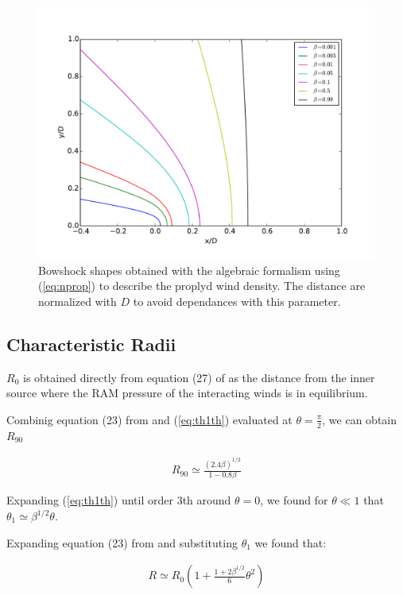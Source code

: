 \begin{figure}
\includegraphics[width=\linewidth]{r-beta}
\caption{Bowshock shapes obtained with the \citep{Canto:1996} algebraic formalism using (\ref{eq:nprop}) to describe the proplyd wind density. The distance are normalized with  $D$
to avoid dependances with this parameter. }
\end{figure}

\subsection{Characteristic Radii}

$R_0$ is obtained directly from equation (27) of \citep{Canto:1996} as the distance from the inner source where the RAM pressure of the interacting winds is in equilibrium.

Combinig equation (23) from \citep{Canto:1996} and  (\ref{eq:th1th}) evaluated at $\theta=\frac{\pi}{2}$, we can obtain $R_{90}$ 

\begin{align}
R_{90} \simeq \frac{\left(2.4\beta\right)^{1/2}}{1-0.8\beta}
\label{eq:r90}
\end{align}

Expanding (\ref{eq:th1th}) until order 3th around $\theta=0$, we found for $\theta \ll 1$ that $\theta_1\simeq \beta^{1/2}\theta$. 

Expanding equation (23) from \citep{Canto:1996} and substituting $\theta_1$ we found that:

\begin{align}
R \simeq R_0 \left(1+\frac{1+2\beta^{1/2}}{6}\theta^2\right)
\label{eq:R_approx}
\end{align}

